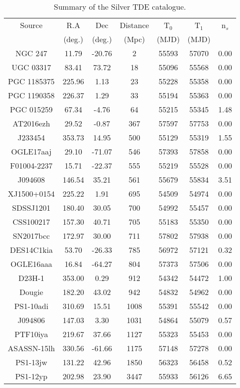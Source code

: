 \begin{table*}
	\centering
	\begin{tabular}{|c | c c c | c c | c |} 
		\hline
		Source & R.A & Dec & Distance & T$_{0}$ & T$_{1}$ & n$_{s}$ \\
		& (deg.) & (deg.) & (Mpc) & (MJD) & (MJD) & \\
		\hline
		NGC 247 & 11.79 & -20.76 & 2 & 55593 & 57070  & 0.00 \\
		UGC 03317 & 83.41 & 73.72 & 18 & 55096 & 55568  & 0.00 \\
		PGC 1185375 & 225.96 & 1.13 & 23 & 55228 & 55358  & 0.00 \\
		PGC 1190358 & 226.37 & 1.29 & 33 & 55194 & 55363  & 0.00 \\
		PGC 015259 & 67.34 & -4.76 & 64 & 55215 & 55345  & 1.48 \\
		AT2016ezh & 29.52 & -0.87 & 367 & 57597 & 57753  & 0.00 \\
		J233454 & 353.73 & 14.95 & 500 & 55129 & 55319  & 1.55 \\
		OGLE17aaj & 29.10 & -71.07 & 546 & 57393 & 57858  & 0.00 \\
		F01004-2237 & 15.71 & -22.37 & 555 & 55219 & 55528  & 0.00 \\
		J094608 & 146.54 & 35.21 & 561 & 55679 & 55834  & 3.51 \\
		XJ1500+0154 & 225.22 & 1.91 & 695 & 54509 & 54974  & 0.00 \\
		SDSSJ1201 & 180.40 & 30.05 & 700 & 54992 & 55457  & 0.00 \\
		CSS100217 & 157.30 & 40.71 & 705 & 55183 & 55350  & 0.00 \\
		SN2017bcc & 172.97 & 30.00 & 711 & 57802 & 57938  & 0.00 \\
		DES14C1kia & 53.70 & -26.33 & 785 & 56972 & 57121  & 0.32 \\
		OGLE16aaa & 16.84 & -64.27 & 804 & 57373 & 57506  & 0.00 \\
		D23H-1 & 353.00 & 0.29 & 912 & 54342 & 54472  & 1.00 \\
		Dougie & 182.20 & 43.02 & 942 & 54832 & 54962  & 0.00 \\
		PS1-10adi & 310.69 & 15.51 & 1008 & 55391 & 55542  & 0.00 \\
		J094806 & 147.03 & 3.30 & 1031 & 54864 & 55079  & 0.57 \\
		PTF10iya & 219.67 & 37.66 & 1127 & 55323 & 55453  & 0.00 \\
		ASASSN-15lh & 330.56 & -61.66 & 1175 & 57148 & 57278  & 0.00 \\
		PS1-13jw & 131.22 & 42.96 & 1850 & 56323 & 56458  & 0.52 \\
		PS1-12yp & 202.98 & 23.90 & 3447 & 55933 & 56126  & 6.65 \\
		\hline
	\end{tabular}
	\caption{Summary of the Silver TDE catalogue.}
	\label{tab:silver_cat}
\end{table*}


